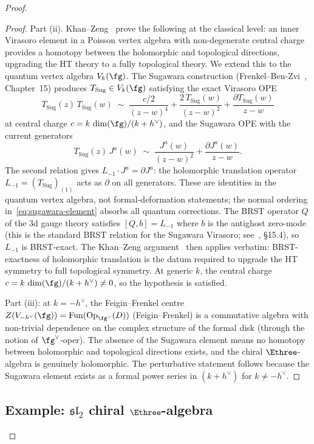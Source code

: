 \begin{proof}
\begin{proof}
Part (ii).
Khan--Zeng~\cite{KhanZeng25} prove the following at the
classical level: an inner Virasoro element in a Poisson
vertex algebra with non-degenerate central charge provides
a homotopy between the holomorphic and topological
directions, upgrading the HT theory to a fully topological
theory. We extend this to the quantum vertex algebra
$V_k(\fg)$. The Sugawara construction
(Frenkel--Ben-Zvi~\cite{FBZ04}, Chapter~15) produces
$T_{\mathrm{Sug}} \in V_k(\fg)$ satisfying the exact
Virasoro OPE
\[
  T_{\mathrm{Sug}}(z)\,T_{\mathrm{Sug}}(w) \;\sim\;
  \frac{c/2}{(z-w)^4}
  + \frac{2\,T_{\mathrm{Sug}}(w)}{(z-w)^2}
  + \frac{\partial T_{\mathrm{Sug}}(w)}{z-w}
\]
at central charge $c = k\,\dim(\fg)/(k+h^\vee)$, and the
Sugawara OPE with the current generators
\[
  T_{\mathrm{Sug}}(z)\,J^a(w) \;\sim\;
  \frac{J^a(w)}{(z-w)^2}
  + \frac{\partial J^a(w)}{z-w}.
\]
The second relation gives $L_{-1} \cdot J^a = \partial J^a$:
the holomorphic translation operator $L_{-1} = (T_{\mathrm{Sug}})_{(1)}$
acts as $\partial$ on all generators. These are identities in
the quantum vertex algebra, not formal-deformation statements;
the normal ordering in~\eqref{eq:sugawara-element} absorbs
all quantum corrections.  The BRST operator $Q$ of the $3$d
gauge theory satisfies $[Q, b] = L_{-1}$ where $b$ is the
antighost zero-mode (this is the standard BRST relation for
the Sugawara Virasoro; see~\cite{FBZ04}, \S15.4), so
$L_{-1}$ is BRST-exact. The Khan--Zeng
argument~\cite{KhanZeng25} then applies verbatim: BRST-exactness
of holomorphic translation is the datum required to upgrade
the HT symmetry to full topological symmetry. At generic
$k$, the central charge
$c = k\,\dim(\fg)/(k+h^\vee) \neq 0$, so the hypothesis is
satisfied.

Part (iii): at $k = -h^\vee$, the Feigin--Frenkel centre
$Z(V_{-h^\vee}(\fg)) = \mathrm{Fun}(\mathrm{Op}_{\fg^\vee}(D))$
(Feigin--Frenkel) is a commutative
algebra with non-trivial dependence on the complex structure
of the formal disk (through the notion of $\fg^\vee$-oper).
The absence of the Sugawara element means no homotopy
between holomorphic and topological directions exists, and
the chiral $\Ethree$-algebra is genuinely holomorphic.
The perturbative statement follows because the Sugawara
element exists as a formal power series in $(k + h^\vee)$ for
$k \neq -h^\vee$.
\end{proof}


\subsection{Example: $\mathfrak{sl}_2$ chiral $\Ethree$-algebra}
\label{subsec:sl2-chiral-e3}


\end{proof}
